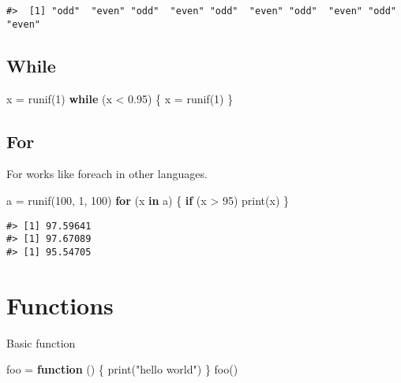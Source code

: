 \documentclass[
]{book}
\newenvironment{Shaded}{\begin{snugshade}}{\end{snugshade}}
\newcommand{\ControlFlowTok}[1]{\textcolor[rgb]{0.13,0.29,0.53}{\textbf{#1}}}
\newcommand{\DecValTok}[1]{\textcolor[rgb]{0.00,0.00,0.81}{#1}}
\newcommand{\FloatTok}[1]{\textcolor[rgb]{0.00,0.00,0.81}{#1}}
\newcommand{\FunctionTok}[1]{\textcolor[rgb]{0.00,0.00,0.00}{#1}}
\newcommand{\NormalTok}[1]{#1}
\newcommand{\OtherTok}[1]{\textcolor[rgb]{0.56,0.35,0.01}{#1}}
\newcommand{\SpecialCharTok}[1]{\textcolor[rgb]{0.00,0.00,0.00}{#1}}
\newcommand{\StringTok}[1]{\textcolor[rgb]{0.31,0.60,0.02}{#1}}
\begin{document}
\begin{verbatim}
#>  [1] "odd"  "even" "odd"  "even" "odd"  "even" "odd"  "even" "odd"  "even"
\end{verbatim}

\hypertarget{while}{%
\section{While}\label{while}}

\begin{Shaded}
\begin{Highlighting}[]
\NormalTok{x }\OtherTok{=} \FunctionTok{runif}\NormalTok{(}\DecValTok{1}\NormalTok{)}
\ControlFlowTok{while}\NormalTok{ (x }\SpecialCharTok{\textless{}} \FloatTok{0.95}\NormalTok{) \{}
\NormalTok{  x }\OtherTok{=} \FunctionTok{runif}\NormalTok{(}\DecValTok{1}\NormalTok{)}
\NormalTok{\}}
\end{Highlighting}
\end{Shaded}

\hypertarget{for}{%
\section{For}\label{for}}

For works like foreach in other languages.

\begin{Shaded}
\begin{Highlighting}[]
\NormalTok{a }\OtherTok{=} \FunctionTok{runif}\NormalTok{(}\DecValTok{100}\NormalTok{, }\DecValTok{1}\NormalTok{, }\DecValTok{100}\NormalTok{)}
\ControlFlowTok{for}\NormalTok{ (x }\ControlFlowTok{in}\NormalTok{ a) \{}
  \ControlFlowTok{if}\NormalTok{ (x }\SpecialCharTok{\textgreater{}} \DecValTok{95}\NormalTok{)}
    \FunctionTok{print}\NormalTok{(x)}
\NormalTok{\}}
\end{Highlighting}
\end{Shaded}

\begin{verbatim}
#> [1] 97.59641
#> [1] 97.67089
#> [1] 95.54705
\end{verbatim}

\hypertarget{functions}{%
\chapter{Functions}\label{functions}}

Basic function

\begin{Shaded}
\begin{Highlighting}[]
\NormalTok{foo }\OtherTok{=} \ControlFlowTok{function}\NormalTok{ () \{}
  \FunctionTok{print}\NormalTok{(}\StringTok{"hello world"}\NormalTok{)}
\NormalTok{\}}
\FunctionTok{foo}\NormalTok{()}
\end{Highlighting}
\end{Shaded}
\end{document}
